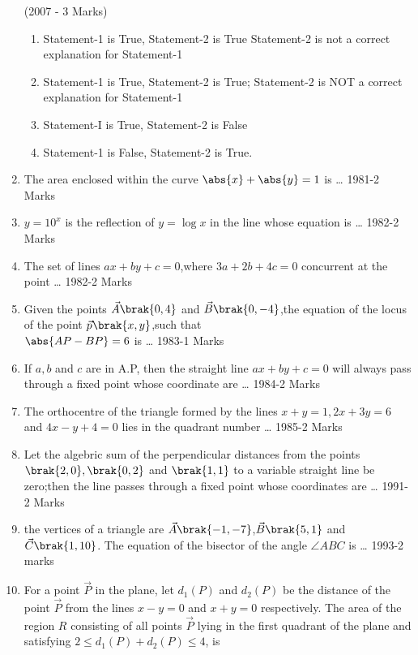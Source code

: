 \begin{enumerate}
\hfill{(2007 - 3 Marks)}
   \begin{enumerate}
   \item Statement-1 is True, Statement-2 is True Statement-2 
is not a correct explanation for Statement-1 
   \item Statement-1 is True, Statement-2 is True; Statement-2 
is NOT a correct explanation for Statement-1 
   \item Statement-I is True, Statement-2 is False
   \item Statement-1 is False, Statement-2 is True. 
   \end{enumerate}
	\item The area enclosed within the curve $\abs{x}+\abs{y} =1$ is \dots
    \hfill{1981-2 Marks}
    \item $y = 10^x $ is the reflection of $y=\log x$ in the line whose equation is \dots
    \hfill{1982-2 Marks}
    \item The set of lines $ax+by+c=0$,where $3a+2b+4c=0$ concurrent at the point \dots
    \hfill{1982-2 Marks}
    \item Given the points $\vec{A}\brak{0,4}$ and $\vec{B}\brak{0,-4}$,the equation of the locus of the point $\vec{p}\brak{x,y}$,such that \\
    $\abs{AP-BP}=6$ is \dots
    \hfill{1983-1 Marks}
    \item If $a,b$ and $c$ are in A.P, then the straight line $ax +by +c=0$ will always pass through a fixed point whose coordinate are \dots
    \hfill{1984-2 Marks}
    \item The orthocentre of the triangle formed by the lines $x+y=1,2x +3y=6$ and $4x-y+4=0$ lies in the quadrant number \dots
    \hfill{1985-2 Marks}
    \item Let the algebric sum of the perpendicular distances from the points $\brak{2,0},\brak{0,2}$ and $\brak{1,1}$ to a variable straight line be zero;then the line passes through a fixed point whose coordinates are \dots
    \hfill{1991-2 Marks}
    \item the vertices of a triangle are $\vec{A}\brak{-1,-7}$,$\vec{B}\brak{5,1}$ and $\vec{C}\brak{1,10}$. The equation of the bisector of the angle $\angle{ABC}$ is \dots
    \hfill{1993-2 marks}
	\item For a point $\vec{P}$ in the plane, let $d_{1}(P)$ and $d_{2}(P)$ be the 
		distance of the point $\vec{P}$ from the lines $x-y=0$ and $x+y =0$ 
respectively. The area of the region $R$ consisting of all points 
		$\vec{P}$ lying in the first quadrant of the plane and satisfying
$2\leq d_{1}(P)+d_{2}(P) \leq4$, is


\end{enumerate}
